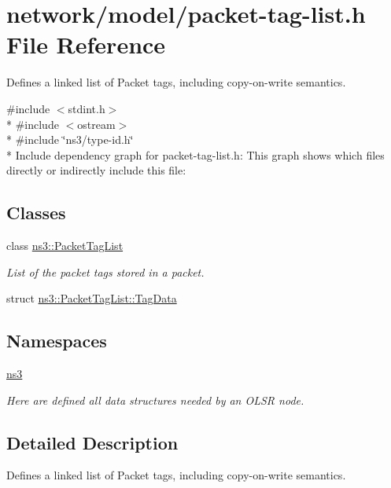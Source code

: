 \hypertarget{packet-tag-list_8h}{}\section{network/model/packet-\/tag-\/list.h File Reference}
\label{packet-tag-list_8h}


Defines a linked list of Packet tags, including copy-\/on-\/write semantics.  


{\ttfamily \#include $<$stdint.\+h$>$}\\*
{\ttfamily \#include $<$ostream$>$}\\*
{\ttfamily \#include \char`\"{}ns3/type-\/id.\+h\char`\"{}}\\*
Include dependency graph for packet-\/tag-\/list.h\+:
This graph shows which files directly or indirectly include this file\+:
\subsection*{Classes}
\begin{DoxyCompactItemize}
\item 
class \hyperlink{classns3_1_1PacketTagList}{ns3\+::\+Packet\+Tag\+List}
\begin{DoxyCompactList}\small\item\em List of the packet tags stored in a packet. \end{DoxyCompactList}\item 
struct \hyperlink{structns3_1_1PacketTagList_1_1TagData}{ns3\+::\+Packet\+Tag\+List\+::\+Tag\+Data}
\end{DoxyCompactItemize}
\subsection*{Namespaces}
\begin{DoxyCompactItemize}
\item 
 \hyperlink{namespacens3}{ns3}
\begin{DoxyCompactList}\small\item\em Here are defined all data structures needed by an O\+L\+SR node. \end{DoxyCompactList}\end{DoxyCompactItemize}


\subsection{Detailed Description}
Defines a linked list of Packet tags, including copy-\/on-\/write semantics. 


